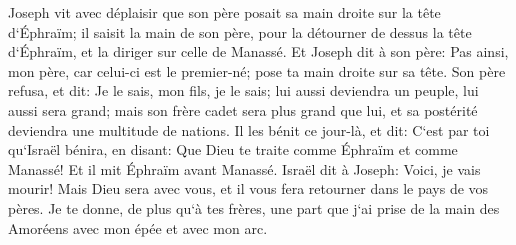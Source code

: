 \verse Joseph vit avec déplaisir que son père posait sa main droite sur la tête d`Éphraïm; il saisit la main de son père, pour la détourner de dessus la tête d`Éphraïm, et la diriger sur celle de Manassé. 
\verse Et Joseph dit à son père: Pas ainsi, mon père, car celui-ci est le premier-né; pose ta main droite sur sa tête. 
\verse Son père refusa, et dit: Je le sais, mon fils, je le sais; lui aussi deviendra un peuple, lui aussi sera grand; mais son frère cadet sera plus grand que lui, et sa postérité deviendra une multitude de nations. 
\verse Il les bénit ce jour-là, et dit: C`est par toi qu`Israël bénira, en disant: Que Dieu te traite comme Éphraïm et comme Manassé! Et il mit Éphraïm avant Manassé. 
\verse Israël dit à Joseph: Voici, je vais mourir! Mais Dieu sera avec vous, et il vous fera retourner dans le pays de vos pères. 
\verse Je te donne, de plus qu`à tes frères, une part que j`ai prise de la main des Amoréens avec mon épée et avec mon arc. 

